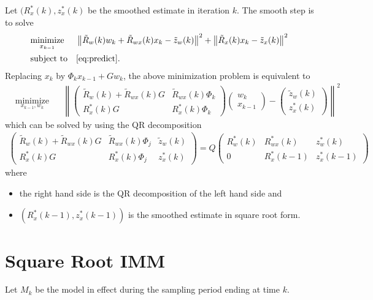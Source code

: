 \documentclass[microtype]{gtpart}     %
\theoremstyle{definition}
\newcommand{\norm}[1]{\left\lVert#1\right\rVert}
\begin{document}
Let $(R^*_x(k), z^*_x(k)$ be the smoothed estimate in iteration $k$.
The smooth step is to solve
\begin{align*}
	& \underset{x_{k-1}}{\text{minimize}} & &\norm{\tilde{R}_w(k)w_k + \tilde{R}_{wx}(k)x_k - \tilde{z}_w(k)}^2 +
	\norm{\tilde{R}_x(k)x_k - \tilde{z}_x(k)}^2 \\
	& \text{subject to} & & \autoref{eq:predict}.
\end{align*}
Replacing $x_k$ by $\Phi_k x_{k-1} + Gw_k$, the above minimization problem is equivalent to
\begin{align*}
	& \underset{x_{k-1}, w_k}{\text{minimize}} & &\norm{
		\begin{pmatrix}
			\tilde{R}_w(k) + \tilde{R}_{wx}(k)G &\tilde{R}_{wx}(k)\Phi_k \\
			R^*_x(k)G &R^*_x(k)\Phi_k
		\end{pmatrix}
		\begin{pmatrix}
		w_k \\ x_{k-1}
		\end{pmatrix} - 
		\begin{pmatrix}
			\tilde{z}_w(k) \\ z^*_x(k)
		\end{pmatrix}}^2
\end{align*}
which can be solved by using the QR decomposition
\begin{align*}
	\begin{pmatrix}
		\tilde{R}_w(k) + \tilde{R}_{wx}(k)G &\tilde{R}_{wx}(k)\Phi_j &\tilde{z}_w(k) \\
		R^*_x(k)G &R^*_x(k)\Phi_j &z^*_x(k)
	\end{pmatrix} = Q
	\begin{pmatrix}
		R^*_w(k) &R^*_{wx}(k) &z^*_w(k) \\
		0 &R^*_x(k-1) &z^*_x(k-1)
	\end{pmatrix}
\end{align*}
where
\begin{itemize}
	\item the right hand side is the QR decomposition of the left hand side and
	\item $(R^*_x(k-1), z^*_x(k-1))$ is the smoothed estimate in square root form.
\end{itemize}

\section{Square Root IMM}

Let $M_k$ be the model in effect during the sampling period ending at time $k$.
 

%
%
%


%


\end{document}
